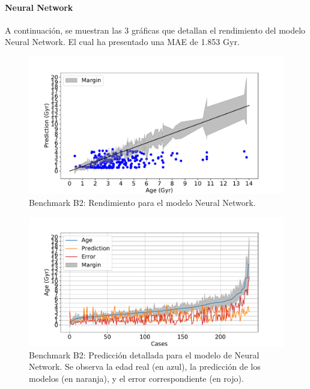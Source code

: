 \paragraph{Neural Network} 
A continuación, se muestran las 3 gráficas que detallan el rendimiento del modelo Neural Network. El cual ha presentado una MAE de 1.853 Gyr.
\begin{figure}[H]
\begin{center}
 \includegraphics[width=0.8\linewidth]{Figuras/Experimentos/B_B2_nnet_1.pdf}
\end{center}
\caption{Benchmark B2: Rendimiento para el modelo Neural Network.}
 \label{fig:benchB2_details_nnet_1}
\end{figure}

\begin{figure}[H]
\begin{center}
 \includegraphics[width=0.8\linewidth]{Figuras/Experimentos/B_B2_nnet_2.pdf}
\end{center}
\caption{Benchmark B2: Predicción detallada para el modelo de Neural Network. Se observa la edad real (en azul), la predicción de los modelos (en naranja), y el error correspondiente (en rojo).}
 \label{fig:benchB2_details_nnet_2}
\end{figure}

